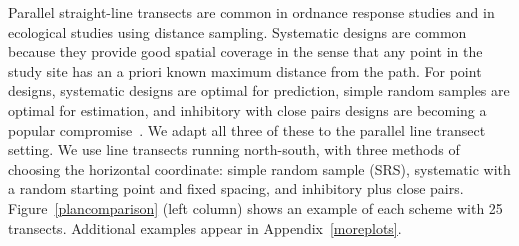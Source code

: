 \documentclass[review]{elsarticle}
\begin{document}
Parallel straight-line transects are common in ordnance response studies and in
ecological studies using distance sampling. Systematic designs are common
because they provide good spatial coverage in the sense that any point in the
study site has an a priori known maximum distance from the path. For point
designs, systematic designs are optimal for prediction, simple random samples
are optimal for estimation, and inhibitory with close pairs designs are
becoming a popular compromise~\citep{chipetaetal2017}. We adapt all three of
these to the parallel line transect setting. We use line transects running
north-south, with three methods of choosing the horizontal coordinate: simple
random sample (SRS), systematic with a random starting point and fixed spacing,
and inhibitory plus close pairs. Figure~\ref{plancomparison} (left column)
shows an example of each scheme with 25 transects. Additional examples appear
in Appendix~\ref{moreplots}.

\end{document}
